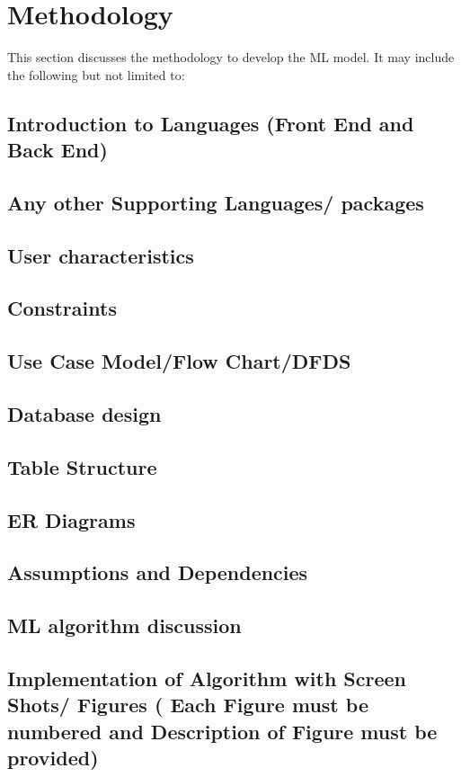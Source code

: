 \chapter{Methodology}
This section discusses the methodology to develop the ML model. It may include the following but not limited to:

\section{Introduction to Languages (Front End and Back End)}
\section{Any other Supporting Languages/ packages}
\section{User characteristics}	
\section{Constraints}	
\section{Use Case Model/Flow Chart/DFDS}
\section{Database design}
\section{Table Structure	}
\section{ER Diagrams}
\section{Assumptions and Dependencies}
\section{ML algorithm discussion}
\section{Implementation of Algorithm with Screen Shots/ Figures ( Each Figure must be numbered and Description of Figure must be provided)}